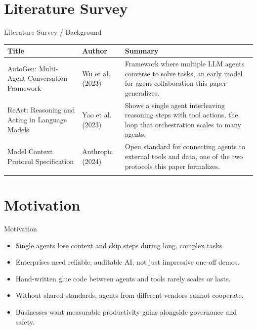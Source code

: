 \documentclass[10pt]{beamer}
\begin{document}
\section{Literature Survey}
\begin{frame}{Literature Survey / Background}
  \small
  \begin{tabular}{@{}p{2.7cm}p{2.3cm}p{5.6cm}@{}}
    \toprule
    \textbf{Title} & \textbf{Author} & \textbf{Summary} \\
    \midrule
    AutoGen: Multi-Agent Conversation Framework & Wu et al. (2023) & Framework where multiple LLM agents converse to solve tasks, an early model for agent collaboration this paper generalizes. \\
    \addlinespace
    ReAct: Reasoning and Acting in Language Models & Yao et al. (2023) & Shows a single agent interleaving reasoning steps with tool actions, the loop that orchestration scales to many agents. \\
    \addlinespace
    Model Context Protocol Specification & Anthropic (2024) & Open standard for connecting agents to external tools and data, one of the two protocols this paper formalizes. \\
    \addlinespace
    \bottomrule
  \end{tabular}
\end{frame}
\section{Motivation}
\begin{frame}{Motivation}
\begin{itemize}
  \item Single agents lose context and skip steps during long, complex tasks.
  \item Enterprises need reliable, auditable AI, not just impressive one-off demos.
  \item Hand-written glue code between agents and tools rarely scales or lasts.
  \item Without shared standards, agents from different vendors cannot cooperate.
  \item Businesses want measurable productivity gains alongside governance and safety.
\end{itemize}
\end{frame}
\end{document}
